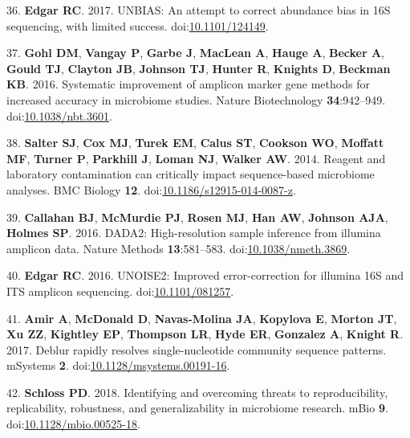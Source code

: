 \documentclass[11pt,]{article}
\begin{document}
\leavevmode\hypertarget{ref-Edgar2017}{}%
36. \textbf{Edgar RC}. 2017. UNBIAS: An attempt to correct abundance
bias in 16S sequencing, with limited success.
doi:\href{https://doi.org/10.1101/124149}{10.1101/124149}.

\leavevmode\hypertarget{ref-Gohl2016}{}%
37. \textbf{Gohl DM}, \textbf{Vangay P}, \textbf{Garbe J},
\textbf{MacLean A}, \textbf{Hauge A}, \textbf{Becker A}, \textbf{Gould
TJ}, \textbf{Clayton JB}, \textbf{Johnson TJ}, \textbf{Hunter R},
\textbf{Knights D}, \textbf{Beckman KB}. 2016. Systematic improvement of
amplicon marker gene methods for increased accuracy in microbiome
studies. Nature Biotechnology \textbf{34}:942--949.
doi:\href{https://doi.org/10.1038/nbt.3601}{10.1038/nbt.3601}.

\leavevmode\hypertarget{ref-Salter2014}{}%
38. \textbf{Salter SJ}, \textbf{Cox MJ}, \textbf{Turek EM},
\textbf{Calus ST}, \textbf{Cookson WO}, \textbf{Moffatt MF},
\textbf{Turner P}, \textbf{Parkhill J}, \textbf{Loman NJ},
\textbf{Walker AW}. 2014. Reagent and laboratory contamination can
critically impact sequence-based microbiome analyses. BMC Biology
\textbf{12}.
doi:\href{https://doi.org/10.1186/s12915-014-0087-z}{10.1186/s12915-014-0087-z}.

\leavevmode\hypertarget{ref-Callahan2016}{}%
39. \textbf{Callahan BJ}, \textbf{McMurdie PJ}, \textbf{Rosen MJ},
\textbf{Han AW}, \textbf{Johnson AJA}, \textbf{Holmes SP}. 2016. DADA2:
High-resolution sample inference from illumina amplicon data. Nature
Methods \textbf{13}:581--583.
doi:\href{https://doi.org/10.1038/nmeth.3869}{10.1038/nmeth.3869}.

\leavevmode\hypertarget{ref-Edgar2016}{}%
40. \textbf{Edgar RC}. 2016. UNOISE2: Improved error-correction for
illumina 16S and ITS amplicon sequencing.
doi:\href{https://doi.org/10.1101/081257}{10.1101/081257}.

\leavevmode\hypertarget{ref-Amir2017a}{}%
41. \textbf{Amir A}, \textbf{McDonald D}, \textbf{Navas-Molina JA},
\textbf{Kopylova E}, \textbf{Morton JT}, \textbf{Xu ZZ},
\textbf{Kightley EP}, \textbf{Thompson LR}, \textbf{Hyde ER},
\textbf{Gonzalez A}, \textbf{Knight R}. 2017. Deblur rapidly resolves
single-nucleotide community sequence patterns. mSystems \textbf{2}.
doi:\href{https://doi.org/10.1128/msystems.00191-16}{10.1128/msystems.00191-16}.

\leavevmode\hypertarget{ref-Schloss2018}{}%
42. \textbf{Schloss PD}. 2018. Identifying and overcoming threats to
reproducibility, replicability, robustness, and generalizability in
microbiome research. mBio \textbf{9}.
doi:\href{https://doi.org/10.1128/mbio.00525-18}{10.1128/mbio.00525-18}.
\end{document}

